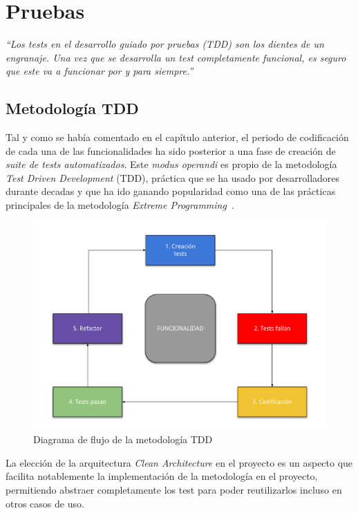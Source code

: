 \chapter{Pruebas}

\textit{``Los tests en el desarrollo guiado por pruebas (TDD) son los dientes de un engranaje.
Una vez que se desarrolla un test completamente funcional, es seguro que este va a funcionar por y
para siempre.''~\cite{beck2003test}
}

\section{Metodología TDD}
Tal y como se había comentado en el capítulo anterior, el periodo de codificación de cada una de las
funcionalidades ha sido posterior a una fase de creación de \textit{suite de tests automatizados}. 
Este \textit{modus operandi}
es propio de la metodología \textit{Test Driven Development} (TDD), práctica que se ha usado por desarrolladores durante
decadas y que ha ido ganando popularidad como una de las prácticas principales de
la metodología \textit{Extreme Programming}~\cite{1510569}.

\begin{figure}[H]
    \centering
    \includegraphics[scale=0.7]{images/tdd_diagram.pdf}
    \caption{Diagrama de flujo de la metodología TDD}
    \label{fig:tdd-diagram}
\end{figure}

La elección de la arquitectura \textit{Clean Architecture} en el proyecto es un aspecto que
facilita notablemente la implementación de la metodología en el proyecto, permitiendo
abstraer completamente los test para poder reutilizarlos incluso en otros casos de uso.

